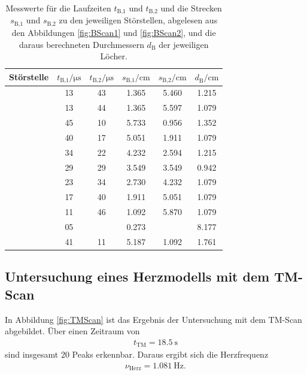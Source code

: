 \begin{table}[h]
  \centering
  \begin{tabular}{S S S S S S}
    \toprule
    {Störstelle} & {$t_\text{B,1}/\si{\micro\second}$} & {$t_\text{B,2}/
    \si{\micro\second}$} & {$s_\text{B,1}/\si{\centi\meter}$} & {$s_\text{B,2}/
    \si{\centi\meter}$} & {$d_\text{B}/\si{\centi\meter}$} \\
    \midrule
     & 13 & 43 & 1.365 & 5.460 & 1.215 \\
     & 13 & 44 & 1.365 & 5.597 & 1.079 \\
     & 45 & 10 & 5.733 & 0.956 & 1.352 \\
     & 40 & 17 & 5.051 & 1.911 & 1.079 \\
     & 34 & 22 & 4.232 & 2.594 & 1.215 \\
     & 29 & 29 & 3.549 & 3.549 & 0.942 \\
     & 23 & 34 & 2.730 & 4.232 & 1.079 \\
     & 17 & 40 & 1.911 & 5.051 & 1.079 \\
     & 11 & 46 & 1.092 & 5.870 & 1.079 \\
     & 05 & \text{ } & 0.273 & \text{ } & 8.177 \\
     & 41 & 11 & 5.187 & 1.092 & 1.761 \\
    \bottomrule
  \end{tabular}
  \caption{Messwerte für die Laufzeiten $t_\text{B,1}$ und $t_\text{B,2}$ und
  die Strecken $s_\text{B,1}$ und $s_\text{B,2}$ zu den jeweiligen
  Störstellen, abgelesen aus den Abbildungen \ref{fig:BScan1} und
  \ref{fig:BScan2}, und die daraus berechneten Durchmessern $d_\text{B}$
  der jeweiligen
  Löcher.}
  \label{tab:BScanZeitenStreckenDicken}
\end{table}

\subsection{Untersuchung eines Herzmodells mit dem TM-Scan}

In Abbildung \ref{fig:TMScan} ist das Ergebnis der Untersuchung mit dem TM-Scan
abgebildet. Über einen Zeitraum von
\begin{align}
  t_\text{TM} = \SI{18.5}{\second}
\end{align}
sind insgesamt 20 Peaks erkennbar.
Daraus ergibt sich die Herzfrequenz
\begin{align}
  \nu_\text{Herz} = \SI{1.081}{\hertz}.
\end{align}

